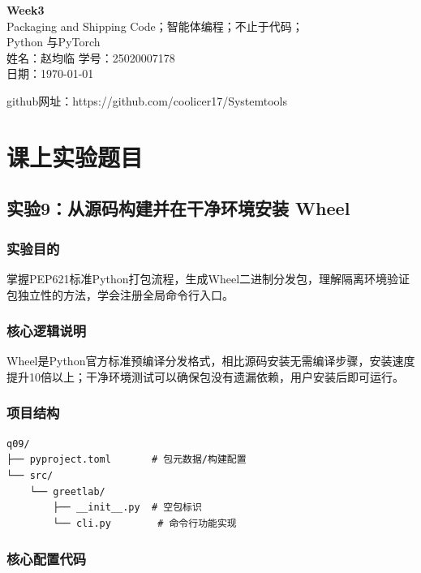 \documentclass[12pt, a4paper]{ctexart}
\begin{document}
\begin{center}
    {\huge \textbf{Week3 }} \\[0.5cm]
    {\large Packaging and Shipping Code；智能体编程；不止于代码；\\Python 与PyTorch} \\
    {\large 姓名：赵均临 \quad 学号：25020007178} \\
    {\large 日期：\today}
\end{center}
\vspace{0.5cm}
\tableofcontents
\newpage

github网址：https://github.com/coolicer17/Systemtools

\section{课上实验题目}
\subsection{实验9：从源码构建并在干净环境安装 Wheel}
\subsubsection{实验目的}
掌握PEP621标准Python打包流程，生成Wheel二进制分发包，理解隔离环境验证包独立性的方法，学会注册全局命令行入口。
\subsubsection{核心逻辑说明}
Wheel是Python官方标准预编译分发格式，相比源码安装无需编译步骤，安装速度提升10倍以上；干净环境测试可以确保包没有遗漏依赖，用户安装后即可运行。
\subsubsection{项目结构}
\begin{verbatim}
q09/
├── pyproject.toml       # 包元数据/构建配置
└── src/
    └── greetlab/
        ├── __init__.py  # 空包标识
        └── cli.py        # 命令行功能实现
\end{verbatim}
\subsubsection{核心配置代码}
\end{document}
